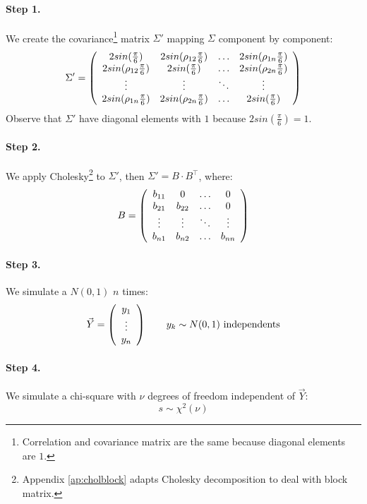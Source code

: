 \documentclass[a4paper,12pt,final]{article}
\begin{document}
\paragraph{Step 1.} We create the covariance\footnote{Correlation and covariance 
matrix are the same because diagonal elements are $1$.} matrix $\Sigma'$ mapping 
$\Sigma$ component by component:
\begin{displaymath}
\Sigma' = \left( 
\begin{array}{cccc}
2 sin(\frac{\pi}{6})           & 2 sin(\rho_{12} \frac{\pi}{6}) & \ldots & 2 sin(\rho_{1n} \frac{\pi}{6})\cr
2 sin(\rho_{12} \frac{\pi}{6}) & 2 sin(\frac{\pi}{6})           & \ldots & 2 sin(\rho_{2n} \frac{\pi}{6})\cr
\vdots                         & \vdots                         & \ddots  & \vdots   \cr
2 sin(\rho_{1n} \frac{\pi}{6}) & 2 sin(\rho_{2n} \frac{\pi}{6}) & \ldots & 2 sin(\frac{\pi}{6})
\end{array}
\right)
\end{displaymath}
Observe that $\Sigma'$ have diagonal elements with $1$ because $2 sin(\frac{\pi}{6}) = 1$.

\paragraph{Step 2.} We apply Cholesky\footnote{Appendix \ref{ap:cholblock} adapts Cholesky 
decomposition to deal with block matrix.} to $\Sigma'$, then $\Sigma' = B \cdot B^{\top}$, 
where:
\begin{displaymath}
B = 
\left(
\begin{array}{cccc}
b_{11}   & 0        & \ldots & 0       \cr
b_{21}   & b_{22}   & \ldots & 0       \cr
\vdots  & \vdots  & \ddots & \vdots \cr
b_{n1}   & b_{n2}   & \ldots & b_{nn}
\end{array}
\right)
\end{displaymath}

\paragraph{Step 3.} We simulate a $N(0,1)$ $n$ times:
\begin{displaymath}
\vec{Y} =
\left(
\begin{array}{c}
y_1 \cr
\vdots \cr
y_n
\end{array}
\right) 
\qquad y_k \sim N(0,1) \textrm{ independents}
\end{displaymath}

\paragraph{Step 4.} We simulate a chi-square with $\nu$ degrees of freedom 
independent of $\vec{Y}$:
\begin{displaymath}
s \sim \chi^2(\nu)
\end{displaymath}
\end{document}
